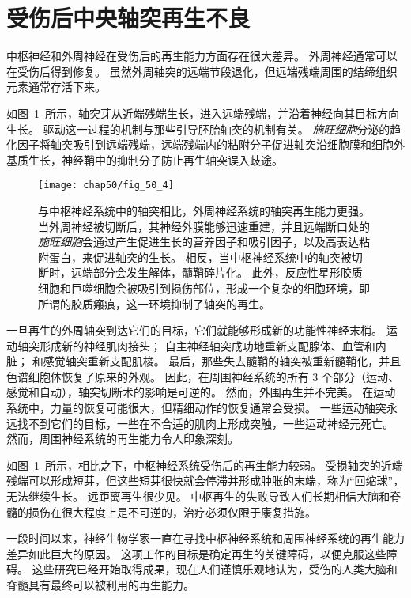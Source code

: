 \section{受伤后中央轴突再生不良}

中枢神经和外周神经在受伤后的再生能力方面存在很大差异。
外周神经通常可以在受伤后得到修复。
虽然外周轴突的远端节段退化，但远端残端周围的结缔组织元素通常存活下来。


如图~\ref{fig:50_4}~所示，轴突芽从近端残端生长，进入远端残端，并沿着神经向其目标方向生长。
驱动这一过程的机制与那些引导胚胎轴突的机制有关。 
\textit{施旺细胞}分泌的趋化因子将轴突吸引到远端残端，远端残端内的粘附分子促进轴突沿细胞膜和细胞外基质生长，神经鞘中的抑制分子防止再生轴突误入歧途。


\begin{figure}[htbp]
	\centering
	\texttt{[image: chap50/fig\_50\_4]}
	\caption{与中枢神经系统中的轴突相比，外周神经系统的轴突再生能力更强。
		当外周神经被切断后，其神经外膜能够迅速重建，并且远端断口处的\textit{施旺细胞}会通过产生促进生长的营养因子和吸引因子，以及高表达粘附蛋白，来促进轴突的生长。
		相反，当中枢神经系统中的轴突被切断时，远端部分会发生解体，髓鞘碎片化。
		此外，反应性星形胶质细胞和巨噬细胞会被吸引到损伤部位，形成一个复杂的细胞环境，即所谓的胶质瘢痕，这一环境抑制了轴突的再生。 }
	\label{fig:50_4}
\end{figure}


一旦再生的外周轴突到达它们的目标，它们就能够形成新的功能性神经末梢。
运动轴突形成新的神经肌肉接头；
自主神经轴突成功地重新支配腺体、血管和内脏；
和感觉轴突重新支配肌梭。
最后，那些失去髓鞘的轴突被重新髓鞘化，并且色谱细胞体恢复了原来的外观。
因此，在周围神经系统的所有 3 个部分（运动、感觉和自动），轴突切断术的影响是可逆的。
然而，外围再生并不完美。
在运动系统中，力量的恢复可能很大，但精细动作的恢复通常会受损。
一些运动轴突永远找不到它们的目标，一些在不合适的肌肉上形成突触，一些运动神经元死亡。
然而，周围神经系统的再生能力令人印象深刻。


如图~\ref{fig:50_4}~所示，相比之下，中枢神经系统受伤后的再生能力较弱。
受损轴突的近端残端可以形成短芽，但这些短芽很快就会停滞并形成肿胀的末端，称为“回缩球”，无法继续生长。
远距离再生很少见。
中枢再生的失败导致人们长期相信大脑和脊髓的损伤在很大程度上是不可逆的，治疗必须仅限于康复措施。


一段时间以来，神经生物学家一直在寻找中枢神经系统和周围神经系统的再生能力差异如此巨大的原因。
这项工作的目标是确定再生的关键障碍，以便克服这些障碍。
这些研究已经开始取得成果，现在人们谨慎乐观地认为，受伤的人类大脑和脊髓具有最终可以被利用的再生能力。


